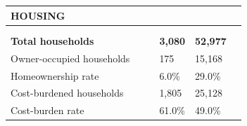 \documentclass[9pt]{report}
\begin{document}
\vspace{12pt}
\setlength{\tabcolsep}{.01in} %
\begin{tabular}{p{.10in}p{.10in}p{.10in}p{3.7in}>{\hfill}p{.85in}>{\hfill}p{.85in}>{\hfill}p{.85in}>{\hfill}p{.85in}p{0.1in}}
\multicolumn{9}{l}{\parbox{7.1in}{\raggedright{\large{\strut\textbf{HOUSING}\strut}}}} \\ 
\hline
\multicolumn{4}{l}{\parbox{3.5in}{\raggedright{\textbf{}}}} & \multicolumn{1}{r}{\parbox{.85in}{\strut\raggedleft{\textbf{}\strut}}} & \multicolumn{1}{r}{\parbox{.85in}{\strut\raggedleft{\textbf{}\strut}}} & \multicolumn{1}{r}{\parbox{.85in}{\strut{}}} & \multicolumn{1}{r}{\parbox{.85in}{\strut{}}} & \\ 
\multicolumn{9}{l}{} \\ 
\multicolumn{4}{l}{\parbox{3.5in}{\strut\raggedright{\textbf{Total households}\strut}}} & \textbf{} & \textbf{} & \textbf{3,080} & \textbf{52,977} & \textbf{} \\ 
\multicolumn{4}{l}{\parbox{3.6in}{\strut\raggedright{{Owner-occupied households}}\strut}} &  &  & 175 & 15,168 & \multicolumn{1}{l}{}  \\ 
\multicolumn{4}{l}{\parbox{3.6in}{\strut\raggedright{{Homeownership rate}}\strut}} &  &  & 6.0\% & 29.0\% & \multicolumn{1}{l}{}  \\ 
\multicolumn{4}{l}{\parbox{3.6in}{\strut\raggedright{{Cost-burdened households}}\strut}} &  &  & 1,805 & 25,128 & \multicolumn{1}{l}{}  \\ 
\multicolumn{4}{l}{\parbox{3.6in}{\strut\raggedright{{Cost-burden rate}}\strut}} &  &  & 61.0\% & 49.0\% & \multicolumn{1}{l}{}  \\ 

\end{tabular}
\setlength{\tabcolsep}{6pt} %
\end{document}
